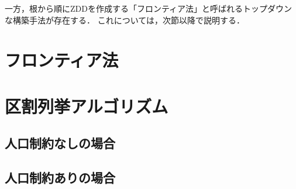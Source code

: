 一方，根から順にZDDを作成する「フロンティア法」と呼ばれるトップダウンな構築手法が存在する．
これについては，次節以降で説明する．

\section{フロンティア法}


\section{区割列挙アルゴリズム}

\subsection{人口制約なしの場合}

\subsection{人口制約ありの場合}
